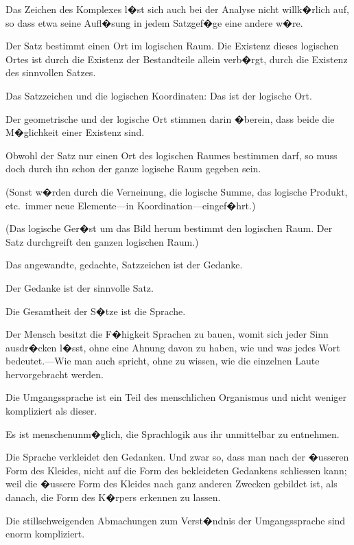 {Das Zeichen des Komplexes l�st sich auch bei
der Analyse nicht willk�rlich auf, so dass etwa seine
Aufl�sung in jedem Satzgef�ge eine andere w�re.}


{Der Satz bestimmt einen Ort im logischen Raum.
Die Existenz dieses logischen Ortes ist durch die
Existenz der Bestandteile allein verb�rgt, durch die
Existenz des sinnvollen Satzes.}


{Das Satzzeichen und die logischen Koordinaten:
\enlargethispage{1pt} %
Das ist der logische Ort.}


{Der geometrische und der logische Ort stimmen
darin �berein, dass beide die M�glichkeit einer
Existenz sind.}


{Obwohl der Satz nur einen Ort des logischen
Raumes bestimmen darf, so muss doch durch
ihn schon der ganze logische Raum gegeben
sein.

(Sonst w�rden durch die Verneinung, die logische
Summe, das logische Produkt, etc.\ immer neue
Elemente---in Ko\-or\-di\-na\-ti\-on---eingef�hrt.)

(Das logische Ger�st um das Bild herum bestimmt
den logischen Raum. Der Satz durchgreift den
ganzen logischen Raum.)}


{Das angewandte, gedachte, Satzzeichen ist der
Gedanke.}


{Der Gedanke ist der sinnvolle Satz.}


{Die Gesamtheit der S�tze ist die Sprache.}


{Der Mensch besitzt die F�higkeit Sprachen zu
bauen, womit sich jeder Sinn ausdr�cken l�sst,
ohne eine Ahnung davon zu haben, wie und was
jedes Wort bedeutet.---Wie man auch spricht, ohne
zu wissen, wie die einzelnen Laute hervorgebracht
werden.

Die Umgangssprache ist ein Teil des menschlichen
Organismus und nicht weniger kompliziert als
dieser.

Es ist menschenunm�glich, die Sprachlogik aus
ihr unmittelbar zu entnehmen.

Die Sprache verkleidet den Gedanken. Und
zwar so, dass man nach der �usseren Form des
Kleides, nicht auf die Form des bekleideten Gedankens
schliessen kann; weil die �ussere Form des
Kleides nach ganz anderen Zwecken gebildet ist, als
danach, die Form des K�rpers erkennen zu lassen.

{\stretchyspace
Die stillschweigenden Abmachungen zum Verst�ndnis
der Umgangssprache sind enorm kompliziert.}}


